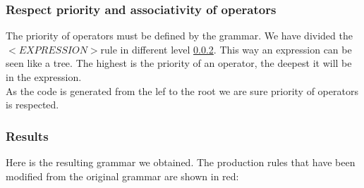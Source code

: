 \subsubsection{Respect priority and associativity of operators}

The priority of operators must be defined by the grammar. We have divided the $<EXPRESSION>$rule in different level \ref{expression}. This way an expression can be seen like a tree. The highest is the priority of an operator, the deepest it will be in the expression.\\ As the code is generated from the lef to the root we are sure priority of operators is respected.  



\subsubsection{Results}
\label{expression}
Here is the resulting grammar we obtained. The production rules that have been modified from the original grammar are shown in red:



